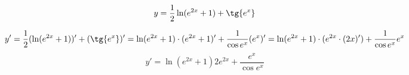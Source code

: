 {}

$$
  y = \dfrac{1}{2}\ln(e^{2x}+1)+\tg{e^x}
$$

$$
  y' = \dfrac{1}{2}(\ln(e^{2x}+1))'+(\tg{e^x})'
     = \ln(e^{2x}+1)\cdot(e^{2x}+1)' + \dfrac{1}{\cos e^x} (e^x)'
     = \ln(e^{2x}+1)\cdot(e^{2x}\cdot(2x)') + \dfrac{1}{\cos e^x} e^x
$$
$$
  y' = \ln(e^{2x}+1) 2e^{2x} + \frac{e^x}{\cos e^x}
$$

%
